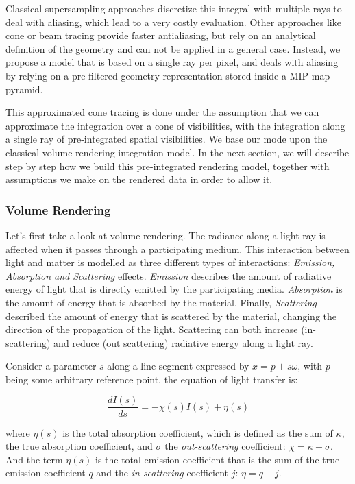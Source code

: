 Classical supersampling approaches discretize this integral with multiple rays to deal with aliasing, which lead to a very costly evaluation. Other approaches like cone or beam tracing provide faster antialiasing, but rely on an analytical definition of the geometry and can not be applied in a general case. Instead, we propose a model that is based on a single ray per pixel, and deals with aliasing by relying on a pre-filtered geometry representation stored inside a MIP-map pyramid.

This approximated cone tracing is done under the assumption that we can approximate the integration over a cone of visibilities, with the integration along a single ray of pre-integrated spatial visibilities. We base our mode upon the classical volume rendering integration model. In the next section, we will describe step by step how we build this pre-integrated rendering model, together with assumptions we make on the rendered data in order to allow it. 



\subsubsection{Volume Rendering}
Let's first take a look at volume rendering. The radiance along a light ray is affected when it passes through a participating medium. This interaction between light and matter is modelled as three different types of interactions: \textit{Emission, Absorption and Scattering} effects. \textit{Emission} describes the amount of radiative energy of light that is directly emitted by the participating media. \textit{Absorption} is the amount of energy that is absorbed by the material. Finally, \textit{Scattering} described the amount of energy that is scattered by the material, changing the direction of the propagation of the light. Scattering can both increase (in-scattering) and reduce (out scattering) radiative energy along a light ray.

Consider a parameter $s$ along a line segment expressed by $x=p+s\omega$, with $p$ being some arbitrary reference point, the equation of light transfer is:

\begin{equation*}
	\frac{dI(s)}{ds}=-\chi (s)I(s)+\eta (s)
\end{equation*}

where $\eta (s)$ is the total absorption coefficient, which is defined as the sum of $\kappa$, the true absorption coefficient, and $\sigma$ the \textit{out-scattering} coefficient: $\chi=\kappa+\sigma$. And the term $\eta(s)$ is the total emission coefficient that is the sum of the true emission coefficient $q$ and the \textit{in-scattering} coefficient $j$: $\eta=q+j$.

